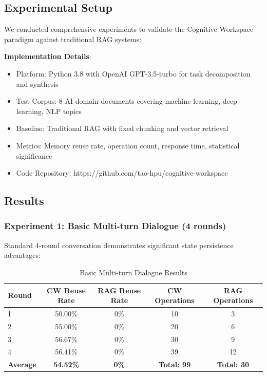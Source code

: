 \documentclass[10pt,twocolumn]{article}
\begin{document}
\subsection{Experimental Setup}

We conducted comprehensive experiments to validate the Cognitive Workspace paradigm against traditional RAG systems:

\textbf{Implementation Details}:
\begin{itemize}
\item Platform: Python 3.8 with OpenAI GPT-3.5-turbo for task decomposition and synthesis
\item Test Corpus: 8 AI domain documents covering machine learning, deep learning, NLP topics
\item Baseline: Traditional RAG with fixed chunking and vector retrieval
\item Metrics: Memory reuse rate, operation count, response time, statistical significance
\item Code Repository: https://github.com/tao-hpu/cognitive-workspace
\end{itemize}

\subsection{Results}

\subsubsection{Experiment 1: Basic Multi-turn Dialogue (4 rounds)}

Standard 4-round conversation demonstrates significant state persistence advantages:

\begin{table}[t]
\centering
\begin{tabular}{lcccc}
\toprule
Round & CW Reuse Rate & RAG Reuse Rate & CW Operations & RAG Operations \\
\midrule
1     & 50.00\%       & 0\%            & 10            & 3              \\
2     & 55.00\%       & 0\%            & 20            & 6              \\
3     & 56.67\%       & 0\%            & 30            & 9              \\
4     & 56.41\%       & 0\%            & 39            & 12             \\
\midrule
\textbf{Average} & \textbf{54.52\%} & \textbf{0\%} & \textbf{Total: 99} & \textbf{Total: 30} \\
\bottomrule
\end{tabular}
\caption{Basic Multi-turn Dialogue Results}
\label{tab:dialogue}
\end{table}
\end{document}
